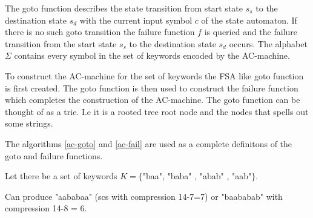 \documentclass[english,twoside,censored,csm,algorithms-track-2020]{HYthesisML}
\theoremstyle{plain}
\theoremstyle{definition}
\begin{document}
\begin{lemma}[]
  The goto function describes the state transition from start state $s_s$ to the destination state
  $s_d$ with the current input symbol $c$ of the state automaton. If there is no such goto transition
  the failure function $f$ is queried and the failure transition from the start state $s_s$ to
  the destination state $s_d$ occurs. The alphabet $\Sigma$ contains every symbol in the set of
  keywords encoded by the AC-machine.

  To construct the AC-machine for the set of keywords the \textsc{FSA} like goto function is first
  created. The goto function is then used to construct the failure function which completes the
  construction of the AC-machine. The goto function can be thought of as a trie. 
  I.e it is a rooted tree 
  root node and the nodes that spells out some strings. 

  The algorithms \ref{ac-goto} and \ref{ac-fail} are used as a complete definitons of the goto and
  failure functions.

  Let there be a set of keywords $K=\{$"baa", "baba" , "abab" , "aab"$\}$. 

  Can produce "aababaa" (scs with compression 14-7=7) or "baababab" with compression 14-8 = 6.


  \begin{figure}
  \centering
\end{figure}
\end{lemma}
\end{document}
